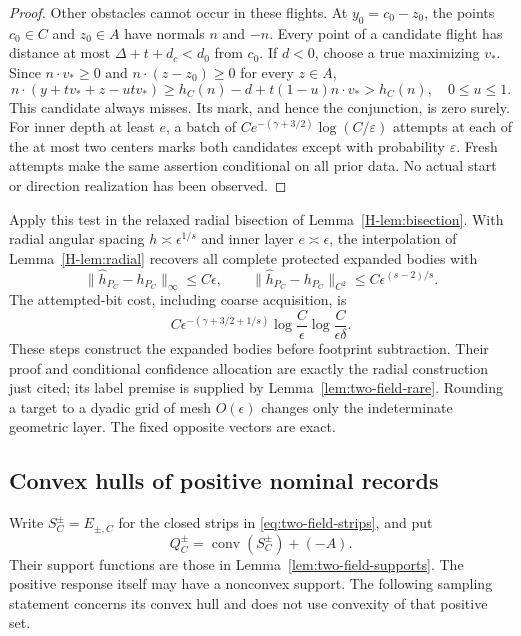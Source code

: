 \begin{proof}
Other obstacles cannot occur in these flights.  At $y_0=c_0-z_0$,
the points $c_0\in C$ and $z_0\in A$ have normals $n$ and $-n$.
Every point of a candidate flight has distance at most
$\Delta+t+d_c<d_0$ from $c_0$.
If $d<0$, choose a true maximizing $v_*$.  Since
$n\cdot v_*\ge0$ and $n\cdot(z-z_0)\ge0$ for every $z\in A$,
\[
 n\cdot(y+tv_*+z-u tv_*)
   \ge h_C(n)-d+t(1-u)n\cdot v_*>h_C(n),\quad 0\le u\le1.
\]
This candidate always misses.  Its mark, and hence the conjunction,
is zero surely.  For inner depth at least $e$, a batch of
$C e^{-(\gamma+3/2)}\log(C/\varepsilon)$ attempts at each of the
at most two centers marks both candidates except with probability
$\varepsilon$.  Fresh attempts make the same assertion conditional
on all prior data.  No actual start or direction realization has
been observed.
\end{proof}

Apply this test in the relaxed radial bisection of
Lemma~\ref{H-lem:bisection}.  With radial angular spacing
$h\asymp\epsilon^{1/s}$ and inner layer $e\asymp\epsilon$, the
interpolation of Lemma~\ref{H-lem:radial} recovers all complete protected
expanded bodies with
\begin{equation}\label{eq:two-field-expanded-errors}
 \|\widehat h_{P_C}-h_{P_C}\|_\infty\le C\epsilon,
 \qquad
 \|\widehat h_{P_C}-h_{P_C}\|_{C^2}
                 \le C\epsilon^{(s-2)/s}.
\end{equation}
The attempted-bit cost, including coarse acquisition, is
\begin{equation}\label{eq:two-field-expanded-cost}
 C\epsilon^{-(\gamma+3/2+1/s)}
       \log\frac C\epsilon\log\frac C{\epsilon\delta}.
\end{equation}
These steps construct the expanded bodies before footprint subtraction.
Their proof and conditional confidence allocation are exactly the
radial construction just cited; its label premise is supplied by
Lemma~\ref{lem:two-field-rare}.  Rounding a target to a dyadic grid
of mesh $O(\epsilon)$ changes only the indeterminate geometric layer.
The fixed opposite vectors are exact.

\subsection{Convex hulls of positive nominal records}
Write $S_C^\pm=E_{\pm,C}$ for the closed strips in
\eqref{eq:two-field-strips}, and put
\[
                       Q_C^\pm=\operatorname{conv}(S_C^\pm)+(-A).
\]
Their support functions are those in
Lemma~\ref{lem:two-field-supports}.  The positive response itself may
have a nonconvex support.  The following sampling statement concerns
its convex hull and does not use convexity of that positive set.

